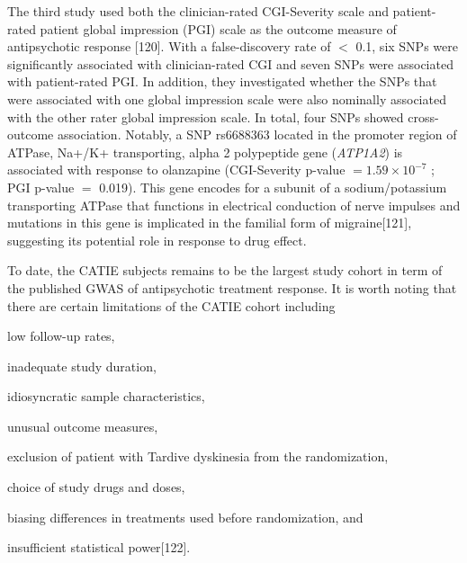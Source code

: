 \documentclass[12pt]{report}
\newcommand{\gene}[1]{\textit{#1}}
\begin{document}
				The third study used both the clinician-rated CGI-Severity scale and patient-rated patient global impression (PGI) scale as the outcome measure of antipsychotic response [120]. 
				With a false-discovery rate of $<$ 0.1, six SNPs were significantly associated with clinician-rated CGI and seven SNPs were associated with patient-rated PGI. 
				In addition, they investigated whether the SNPs that were associated with one global impression scale were also nominally associated with the other rater global impression scale. 
				In total, four SNPs showed cross-outcome association. 
				Notably, a SNP rs6688363 located in the promoter region of ATPase, Na+/K+ transporting, alpha 2 polypeptide gene (\gene{ATP1A2}) is associated with response to olanzapine (CGI-Severity p-value $= 1.59 \times 10^{-7}$ ; PGI p-value $=$ 0.019). 
				This gene encodes for a subunit of a sodium/potassium transporting ATPase that functions in electrical conduction of nerve impulses and mutations in this gene is implicated in the familial form of migraine[121], suggesting its potential role in response to drug effect.
				 
				To date, the CATIE subjects remains to be the largest study cohort in term of the published GWAS of antipsychotic treatment response. 
				It is worth noting that there are certain limitations of the CATIE cohort including 
				\begin{enumerate*}[label=\arabic*)]
					\item low follow-up rates,
					\item inadequate study duration, 
					\item idiosyncratic sample characteristics, 
					\item unusual outcome measures, 
					\item exclusion of patient with  Tardive dyskinesia from the randomization, 
					\item choice of study drugs and doses,
					\item biasing differences in treatments used before randomization, and
					\item insufficient statistical power[122].
				\end{enumerate*} 
				
\end{document}
